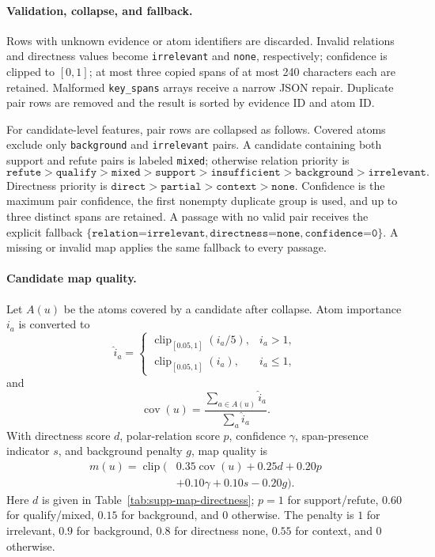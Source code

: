 \paragraph{Validation, collapse, and fallback.}
Rows with unknown evidence or atom identifiers are discarded.  Invalid
relations and directness values become \texttt{irrelevant} and \texttt{none},
respectively; confidence is clipped to \([0,1]\); at most three copied spans
of at most 240 characters each are retained.  Malformed \texttt{key\_spans}
arrays receive a narrow JSON repair.  Duplicate pair rows are removed and
the result is sorted by evidence ID and atom ID.

For candidate-level features, pair rows are collapsed as follows.  Covered
atoms exclude only \texttt{background} and \texttt{irrelevant} pairs.  A
candidate containing both support and refute pairs is labeled
\texttt{mixed}; otherwise relation priority is
\[
\texttt{refute}>\texttt{qualify}>\texttt{mixed}>\texttt{support}>
\texttt{insufficient}>\texttt{background}>\texttt{irrelevant}.
\]
Directness priority is
\(\texttt{direct}>\texttt{partial}>\texttt{context}>\texttt{none}\).
Confidence is the maximum pair confidence, the first nonempty duplicate group
is used, and up to three distinct spans are retained.  A passage with no
valid pair receives the explicit fallback
\(\{\texttt{relation=irrelevant},\texttt{directness=none},
\texttt{confidence=0}\}\).  A missing or invalid map applies the same
fallback to every passage.

\paragraph{Candidate map quality.}
Let \(A(u)\) be the atoms covered by a candidate after collapse.  Atom
importance \(i_a\) is converted to
\[
\widehat i_a =
\begin{cases}
\operatorname{clip}_{[0.05,1]}(i_a/5),& i_a>1,\\
\operatorname{clip}_{[0.05,1]}(i_a),& i_a\leq 1,
\end{cases}
\]
and
\[
\operatorname{cov}(u)=
\frac{\sum_{a\in A(u)}\widehat i_a}{\sum_a\widehat i_a}.
\]
With directness score \(d\), polar-relation score \(p\), confidence \(\gamma\),
span-presence indicator \(s\), and background penalty \(g\), map quality is
\begin{equation}
\begin{aligned}
m(u)=\operatorname{clip}\!\bigl(&
0.35\operatorname{cov}(u)+0.25d+0.20p\\
&+0.10\gamma+0.10s-0.20g\bigr).
\end{aligned}
\label{eq:supp-map-quality}
\end{equation}
Here \(d\) is given in Table~\ref{tab:supp-map-directness};
\(p=1\) for support/refute, \(0.60\) for qualify/mixed, \(0.15\) for
background, and \(0\) otherwise.  The penalty is \(1\) for irrelevant,
\(0.9\) for background, \(0.8\) for directness none, \(0.55\) for context,
and \(0\) otherwise.

